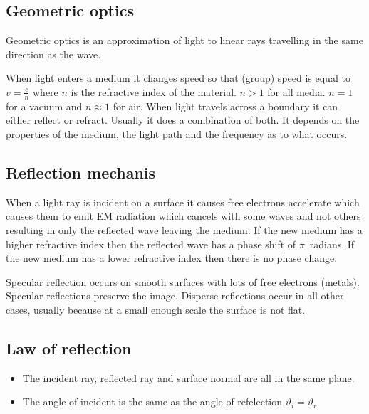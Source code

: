 \subsection*{Geometric optics}

Geometric optics is an approximation of light to linear rays travelling in the same direction as the wave.

When light enters a medium it changes speed so that (group) speed is equal to \(v=\frac cn\) where \(n\) is the refractive index of the material. \(n>1\) for all media. \(n=1\) for a vacuum and \(n\approx1\) for air. When light travels across a boundary it can either reflect or refract. Usually it does a combination of both. It depends on the properties of the medium, the light path and the frequency as to what occurs.

\subsection*{Reflection mechanis}

When a light ray is incident on a surface it causes free electrons accelerate which causes them to emit EM radiation which cancels with some waves and not others resulting in only the reflected wave leaving the medium. If the new medium has a higher refractive index then the reflected wave has a phase shift of \(\pi\)~radians. If the new medium has a lower refractive index then there is no phase change.

Specular reflection occurs on smooth surfaces with lots of free electrons (metals). Specular reflections preserve the image. Disperse reflections occur in all other cases, usually because at a small enough scale the surface is not flat.

\subsection*{Law of reflection}

\begin{itemize}
\item The incident ray, reflected ray and surface normal are all in the same plane.
\item The angle of incident is the same as the angle of refelection \(\vartheta_i=\vartheta_r\)
\end{itemize}

\begin{center}
\end{center}

